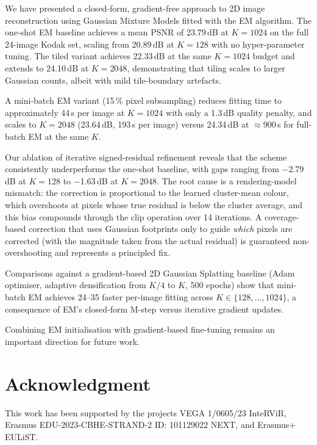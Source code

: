 \documentclass[a4paper,conference]{IEEEtran}
\begin{document}
We have presented a closed-form, gradient-free approach to 2D image
reconstruction using Gaussian Mixture Models fitted with the EM algorithm.
The one-shot EM baseline achieves a mean PSNR of 23.79\,dB at $K\!=\!1024$
on the full 24-image Kodak set, scaling from 20.89\,dB at $K\!=\!128$ with
no hyper-parameter tuning.
The tiled variant achieves 22.33\,dB at the same $K\!=\!1024$ budget and
extends to 24.10\,dB at $K\!=\!2048$, demonstrating that tiling scales to
larger Gaussian counts, albeit with mild tile-boundary artefacts.

A mini-batch EM variant (15\,\% pixel subsampling) reduces fitting time
to approximately 44\,s per image at $K\!=\!1024$ with only a 1.3\,dB
quality penalty, and scales to $K\!=\!2048$ (23.64\,dB, 193\,s per image)
versus 24.34\,dB at $\approx$900\,s for full-batch EM at the same $K$.

Our ablation of iterative signed-residual refinement reveals that the
scheme consistently underperforms the one-shot baseline, with gaps ranging
from $-$2.79\,dB at $K\!=\!128$ to $-$1.63\,dB at $K\!=\!2048$.
The root cause is a rendering-model mismatch: the correction is proportional
to the learned cluster-mean colour, which overshoots at pixels whose true
residual is below the cluster average, and this bias compounds through the
clip operation over 14 iterations.
A coverage-based correction that uses Gaussian footprints only to guide
\emph{which} pixels are corrected (with the magnitude taken from the actual
residual) is guaranteed non-overshooting and represents a principled fix.

Comparisons against a gradient-based 2D Gaussian Splatting baseline
(Adam optimiser, adaptive densification from $K/4$ to $K$, 500 epochs)
show that mini-batch EM achieves 24--35{\texttimes} faster per-image
fitting across $K\!\in\!\{128,\ldots,1024\}$, a consequence of EM's
closed-form M-step versus iterative gradient updates.

Combining EM initialisation with gradient-based fine-tuning
remains an important direction for future work.

\section*{Acknowledgment}
This work has been supported by the projects VEGA 1/0605/23 InteRViR,
Erasmus EDU-2023-CBHE-STRAND-2 ID: 101129022 NEXT, and Erasmus+ EULiST.



\end{document}
